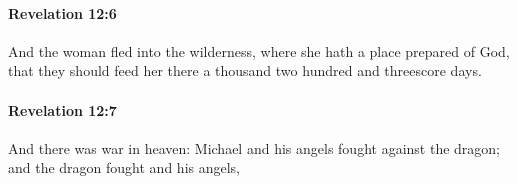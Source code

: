 		\paragraph{Revelation 12:6} %
			\label{REVELATIONNT-12-6}

			And the woman fled into the wilderness, where she hath a place prepared of God, that they should feed her there a thousand two hundred and threescore days.

			\begin{framed}
			\scriptsize
				\begin{compactdesc}
					\item[SBLG] 
				\end{compactdesc}
			\end{framed}

		\paragraph{Revelation 12:7} %
			\label{REVELATIONNT-12-7}

			And there was war in heaven: Michael and his angels fought against the dragon; and the dragon fought and his angels,

